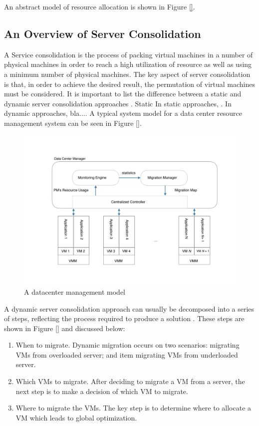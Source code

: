 An abstract model of resource allocation is shown in Figure \ref{}.





\subsection*{An Overview of Server Consolidation}

A Service consolidation is the process of packing virtual machines in a number of physical 
machines in order to reach a high utilization of resource as well as using a minimum number of 
physical machines. The key aspect of server consolidation is that, in order to achieve the 
desired result, the permutation of virtual machines must be considered. It is important to list the 
difference between a static and dynamic server consolidation approaches \cite{}. 
Static 
In static approaches, . In dynamic approaches, bla.... A typical system model for a data center
resource management system can be seen in Figure \ref{}. 
\begin{figure}
	\centering
	\includegraphics[width=1.0\textwidth]{pics/dataCenter-1.png}
	\caption{A datacenter management model \cite{Varasteh:2015fu}}
	\label{fig:arch}
\end{figure}


A dynamic server consolidation approach
can usually be decomposed into a series of steps, 
reflecting the process required to produce a solution \cite{}. 
These steps are shown in Figure \ref{} and discussed below:
\begin{enumerate}
	\item When to migrate. Dynamic migration occurs on two scenarios: migrating VMs from overloaded server; and item migrating VMs from underloaded server.
	\item Which VMs to migrate.  After deciding to migrate a VM from a server, the next step is 
	to make a decision of which VM to migrate.
	\item Where to migrate the VMs. The key step is to determine where to allocate a VM which leads to global optimization.
\end{enumerate}


